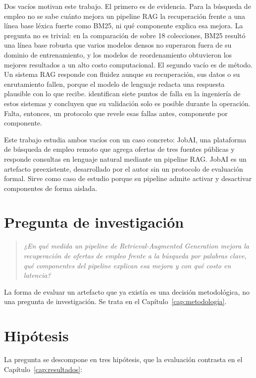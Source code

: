 Dos vacíos motivan este trabajo. El primero es de evidencia. Para la búsqueda de empleo no se sabe cuánto mejora un pipeline RAG la recuperación frente a una línea base léxica fuerte como BM25, ni qué componente explica esa mejora. La pregunta no es trivial: en la comparación de \citet{Thakur2021} sobre 18 colecciones, BM25 resultó una línea base robusta que varios modelos densos no superaron fuera de su dominio de entrenamiento, y los modelos de reordenamiento obtuvieron los mejores resultados a un alto costo computacional. El segundo vacío es de método. Un sistema RAG responde con fluidez aunque su recuperación, sus datos o su enrutamiento fallen, porque el modelo de lenguaje redacta una respuesta plausible con lo que recibe. \citet{Barnett2024} identifican siete puntos de falla en la ingeniería de estos sistemas y concluyen que su validación solo es posible durante la operación. Falta, entonces, un protocolo que revele esas fallas antes, componente por componente.

Este trabajo estudia ambos vacíos con un caso concreto: JobAI, una plataforma de búsqueda de empleo remoto que agrega ofertas de tres fuentes públicas y responde consultas en lenguaje natural mediante un pipeline RAG. JobAI es un artefacto preexistente, desarrollado por el autor sin un protocolo de evaluación formal. Sirve como caso de estudio porque su pipeline admite activar y desactivar componentes de forma aislada.

\section{Pregunta de investigación}

\begin{quote}
\textit{¿En qué medida un pipeline de Retrieval-Augmented Generation mejora la recuperación de ofertas de empleo frente a la búsqueda por palabras clave, qué componentes del pipeline explican esa mejora y con qué costo en latencia?}
\end{quote}

La forma de evaluar un artefacto que ya existía es una decisión metodológica, no una pregunta de investigación. Se trata en el Capítulo~\ref{cap:metodologia}.

\section{Hipótesis}
\label{sec:hipotesis}

La pregunta se descompone en tres hipótesis, que la evaluación contrasta en el Capítulo~\ref{cap:resultados}:

